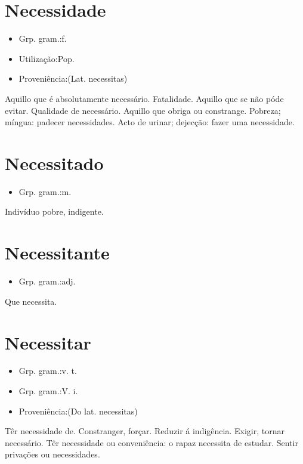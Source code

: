 \section{Necessidade}
\begin{itemize}
\item {Grp. gram.:f.}
\end{itemize}
\begin{itemize}
\item {Utilização:Pop.}
\end{itemize}
\begin{itemize}
\item {Proveniência:(Lat. \textunderscore necessitas\textunderscore )}
\end{itemize}
Aquillo que é absolutamente necessário.
Fatalidade.
Aquillo que se não póde evitar.
Qualidade de necessário.
Aquillo que obriga ou constrange.
Pobreza; míngua: \textunderscore padecer necessidades\textunderscore .
Acto de urinar; dejecção: \textunderscore fazer uma necessidade\textunderscore .
\section{Necessitado}
\begin{itemize}
\item {Grp. gram.:m.}
\end{itemize}
Indivíduo pobre, indigente.
\section{Necessitante}
\begin{itemize}
\item {Grp. gram.:adj.}
\end{itemize}
Que necessita.
\section{Necessitar}
\begin{itemize}
\item {Grp. gram.:v. t.}
\end{itemize}
\begin{itemize}
\item {Grp. gram.:V. i.}
\end{itemize}
\begin{itemize}
\item {Proveniência:(Do lat. \textunderscore necessitas\textunderscore )}
\end{itemize}
Têr necessidade de.
Constranger, forçar.
Reduzir á indigência.
Exigir, tornar necessário.
Têr necessidade ou conveniência: \textunderscore o rapaz necessita de estudar\textunderscore .
Sentir privações ou necessidades.
